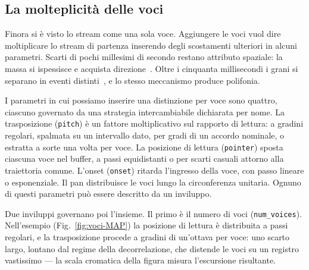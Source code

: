 %

\subsection{La molteplicità delle voci}\label{sec:voci}

Finora si è visto lo stream come una sola voce. 
Aggiungere le voci vuol dire moltiplicare lo stream di partenza 
inserendo degli scostamenti ulteriori in alcuni parametri. 
Scarti di pochi millesimi di secondo restano attributo spaziale:
la massa si ispessisce e acquista direzione~\cite{Vaggione2002}. Oltre i
cinquanta millisecondi i grani si separano in eventi
distinti~\cite[p.~18]{Truax1988}, e lo stesso meccanismo produce polifonia.

I parametri in cui possiamo inserire una distinzione per voce sono quattro, 
ciascuno governato da una strategia
intercambiabile dichiarata per nome. La trasposizione (\texttt{pitch}) è un
fattore moltiplicativo sul rapporto di lettura: a gradini regolari, spalmata
su un intervallo dato, per gradi di un accordo nominale, o estratta a sorte
una volta per voce. La posizione di lettura (\texttt{pointer}) sposta ciascuna
voce nel buffer, a passi equidistanti o per scarti casuali attorno alla
traiettoria comune. L'onset (\texttt{onset}) ritarda l'ingresso della voce,
con passo lineare o esponenziale. Il pan distribuisce le voci lungo la circonferenza
unitaria. Ognuno di questi parametri può essere descritto da un inviluppo.

Due inviluppi governano poi l'insieme. Il primo è il numero di voci
(\texttt{num\_voices}). Nell'esempio
(Fig.~\ref{fig:voci-MAP}) la posizione di lettura è distribuita a passi
regolari, e la trasposizione procede a gradini di un'ottava per voce: uno
scarto largo, lontano dal regime della decorrelazione, che distende le voci
su un registro vastissimo --- la scala cromatica della figura misura
l'escursione risultante.


